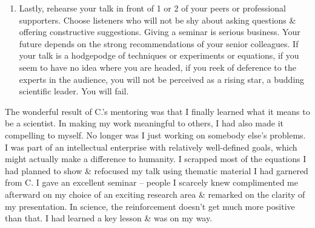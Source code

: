 \documentclass{article}
\begin{document}
\begin{enumerate}
\begin{itemize}
\begin{itemize}
\begin{enumerate}
				\item Lastly, rehearse your talk in front of 1 or 2 of your peers or professional supporters. Choose listeners who will not be shy about asking questions \& offering constructive suggestions. Giving a seminar is serious business. Your future depends on the strong recommendations of your senior colleagues. If your talk is a hodgepodge of techniques or experiments or equations, if you seem to have no idea where you are headed, if you reek of deference to the experts in the audience, you will not be perceived as a rising star, a budding scientific leader. You will fail.
			\end{enumerate}
			The wonderful result of C.'s mentoring was that I finally learned what it means to be a scientist. In making my work meaningful to others, I had also made it compelling to myself. No longer was I just working on somebody else's problems. I was part of an intellectual enterprise with relatively well-defined goals, which might actually make a difference to humanity. I scrapped most of the equations I had planned to show \& refocused my talk using thematic material I had garnered from C. I gave an excellent seminar -- people I scarcely knew complimented me afterward on my choice of an exciting research area \& remarked on the clarity of my presentation. In science, the reinforcement doesn't get much more positive than that. I had learned a key lesson \& was on my way.


\end{itemize}
\end{itemize}
\end{enumerate}
\end{document}
